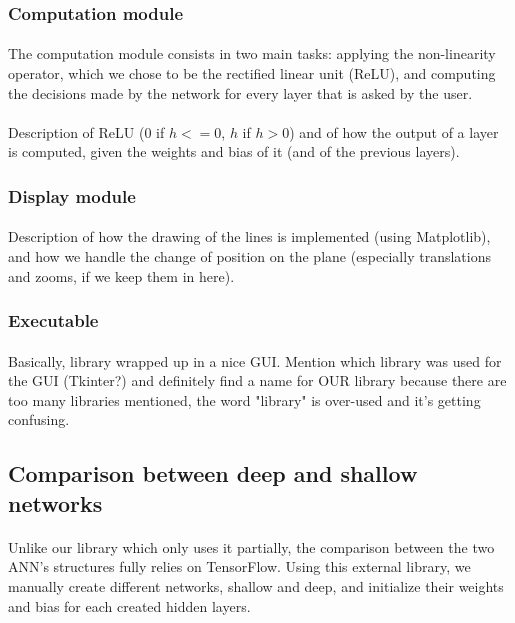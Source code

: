 \documentclass[a4paper]{article}
\begin{document}
\subsubsection{Computation module}
\paragraph{}The computation module consists in two main tasks: applying the non-linearity operator, which we chose to be the rectified linear unit (ReLU), and computing the decisions made by the network for every layer that is asked by the user.

\paragraph{}Description of ReLU ($0$ if $h <= 0$, $h$ if $h > 0$) and of how the output of a layer is computed, given the weights and bias of it (and of the previous layers).

\subsubsection{Display module}
\paragraph{}Description of how the drawing of the lines is implemented (using Matplotlib), and how we handle the change of position on the plane (especially translations and zooms, if we keep them in here).

\subsubsection{Executable}
\paragraph{}Basically, library wrapped up in a nice GUI. Mention which library was used for the GUI (Tkinter?) and definitely find a name for OUR library because there are too many libraries mentioned, the word "library" is over-used and it's getting confusing.


\subsection{Comparison between deep and shallow networks}
\paragraph{}Unlike our library which only uses it partially, the comparison between the two ANN's structures fully relies on TensorFlow. Using this external library, we manually create different networks, shallow and deep, and initialize their weights and bias for each created hidden layers. 
\end{document}
